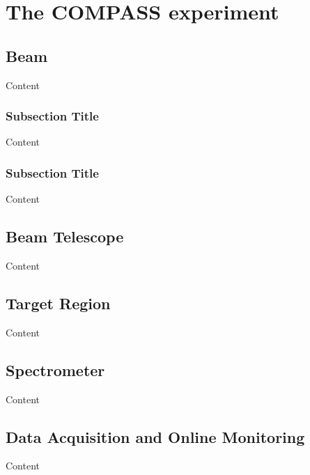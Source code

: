 
\chapter{The COMPASS experiment} %

\label{ch:exp} %


\section{Beam}

Content


\subsection{Subsection Title}

Content


\subsection{Subsection Title}

Content


\section{Beam Telescope}

Content


\section{Target Region}

Content


\section{Spectrometer}

Content


\section{Data Acquisition and Online Monitoring}

Content
